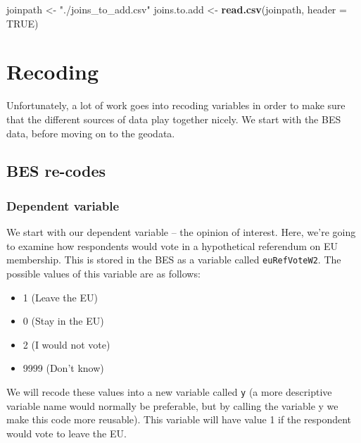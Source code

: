 \documentclass[12pt,twoside]{article}
\newenvironment{Shaded}{}{}
\newcommand{\KeywordTok}[1]{\textcolor[rgb]{0.00,0.44,0.13}{\textbf{{#1}}}}
\newcommand{\DataTypeTok}[1]{\textcolor[rgb]{0.56,0.13,0.00}{{#1}}}
\newcommand{\DecValTok}[1]{\textcolor[rgb]{0.25,0.63,0.44}{{#1}}}
\newcommand{\StringTok}[1]{\textcolor[rgb]{0.25,0.44,0.63}{{#1}}}
\newcommand{\OtherTok}[1]{\textcolor[rgb]{0.00,0.44,0.13}{{#1}}}
\newcommand{\NormalTok}[1]{{#1}}
\begin{document}
\begin{Shaded}
\begin{Highlighting}[]
\NormalTok{joinpath <-}\StringTok{ "./joins_to_add.csv"}
\NormalTok{joins.to.add <-}\StringTok{ }\KeywordTok{read.csv}\NormalTok{(joinpath, }\DataTypeTok{header =} \OtherTok{TRUE}\NormalTok{)}
\end{Highlighting}
\end{Shaded}

\section{Recoding}\label{recoding}

Unfortunately, a lot of work goes into recoding variables in order to
make sure that the different sources of data play together nicely. We
start with the BES data, before moving on to the geodata.

\subsection{BES re-codes}\label{bes-re-codes}

\subsubsection{Dependent variable}\label{dependent-variable}

We start with our dependent variable -- the opinion of interest. Here,
we're going to examine how respondents would vote in a hypothetical
referendum on EU membership. This is stored in the BES as a variable
called \texttt{euRefVoteW2}. The possible values of this variable are as
follows:

\begin{itemize}
\itemsep1pt\parskip0pt
\item
  1 (Leave the EU)
\item
  0 (Stay in the EU)
\item
  2 (I would not vote)
\item
  9999 (Don't know)
\end{itemize}

We will recode these values into a new variable called \texttt{y} (a
more descriptive variable name would normally be preferable, but by
calling the variable y we make this code more reusable). This variable
will have value 1 if the respondent would vote to leave the EU.

\begin{Shaded}
\end{Shaded}
\end{document}
